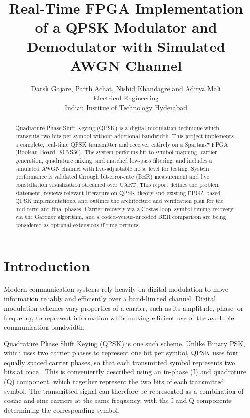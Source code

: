\documentclass[10pt,twocolumn,letterpaper]{article}
\begin{document}
\title{Real-Time FPGA Implementation of a QPSK Modulator and Demodulator with Simulated AWGN Channel}
\author{Darsh Gajare, Parth Achat, Nishid Khandagre and Aditya Mali\\
Electrical Engineering\\
Indian Institue of Technology Hyderabad}
\maketitle


\begin{abstract}
	Quadrature Phase Shift Keying (QPSK) is a digital modulation technique which transmits two bits per symbol without additional bandwidth. This project implements a complete, real-time QPSK transmitter and receiver entirely on a Spartan-7 FPGA (Boolean Board, XC7S50). The system performs bit-to-symbol mapping, carrier generation, quadrature mixing, and matched low-pass filtering, and includes a simulated AWGN channel with live-adjustable noise level for testing. System performance is validated through bit-error-rate (BER) measurement and live constellation visualization streamed over UART. This report defines the problem statement, reviews relevant literature on QPSK theory and existing FPGA-based QPSK implementations, and outlines the architecture and verification plan for the mid-term and final phases. Carrier recovery via a Costas loop, symbol timing recovery via the Gardner algorithm, and a coded-versus-uncoded BER comparison are being considered as optional extensions if time permits.


\end{abstract}

\section{Introduction}
\label{sec:intro}

Modern communication systems rely heavily on digital modulation to
move information reliably and efficiently over a band-limited
channel. Digital modulation schemes vary properties of a carrier, such
as its amplitude, phase, or frequency, to represent information while
making efficient use of the available communication bandwidth.

Quadrature Phase Shift Keying (QPSK) is one such scheme. Unlike Binary
PSK, which uses two carrier phases to represent one bit per symbol,
QPSK uses four equally spaced carrier phases, so that each transmitted
symbol represents two bits at once \cite{qpsk_nptel}. This is conveniently described
using an in-phase (I) and quadrature (Q) component, which together
represent the two bits of each transmitted symbol. The transmitted
signal can therefore be represented as a combination of cosine and
sine carriers at the same frequency, with the I and Q components
determining the corresponding symbol.
\end{document}
